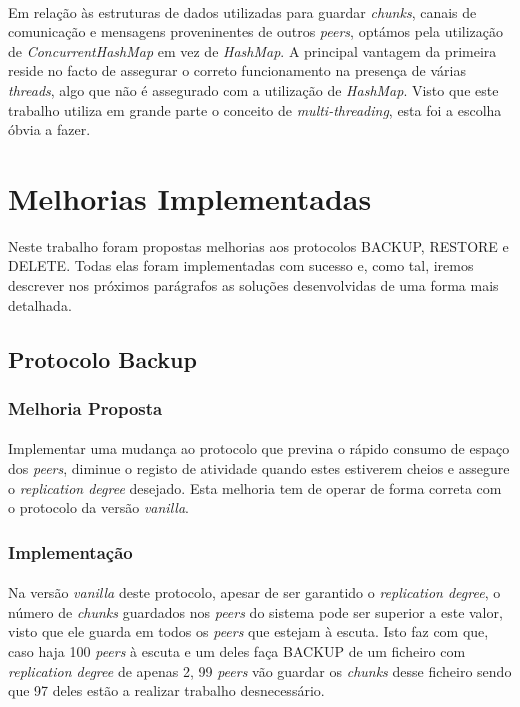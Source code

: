 \documentclass[11pt,oneside]{book}
\begin{document}
\paragraph{}
    Em relação às estruturas de dados utilizadas para guardar \textit{chunks},
    canais de comunicação e  
    mensagens proveninentes de outros \textit{peers}, optámos pela utilização de
    \textit{ConcurrentHashMap} em vez de \textit{HashMap}. A principal vantagem da
    primeira reside no facto de assegurar o correto funcionamento na presença de 
    várias \textit{threads}, algo que não é assegurado com a utilização de 
    \textit{HashMap}. Visto que este trabalho utiliza em grande parte o conceito de 
    \textit{multi-threading}, esta foi a escolha óbvia a fazer.
\pagebreak 

\section{Melhorias Implementadas}
    Neste trabalho foram propostas melhorias aos protocolos BACKUP, RESTORE e 
    DELETE. Todas elas foram implementadas com sucesso e, como tal, iremos descrever
    nos próximos parágrafos as soluções desenvolvidas de uma forma mais detalhada. 

\subsection{Protocolo Backup}

\subsubsection{Melhoria Proposta}
\paragraph{}
Implementar uma mudança ao protocolo que previna o rápido consumo de espaço dos 
\textit{peers}, diminue o registo de atividade quando estes estiverem cheios e 
assegure o \textit{replication degree} desejado. Esta melhoria tem de operar
de forma correta com o protocolo da versão \textit{vanilla}.

\subsubsection{Implementação}
\paragraph{}
    Na versão \textit{vanilla} deste protocolo, apesar de ser garantido o 
    \textit{replication degree}, o número de \textit{chunks} guardados nos 
    \textit{peers} do sistema pode ser superior a este valor, visto que ele
    guarda em todos os \textit{peers} que estejam à escuta. Isto faz com que, 
    caso haja 100 \textit{peers} à escuta e um deles faça BACKUP de um ficheiro
    com \textit{replication degree} de apenas 2, 99 \textit{peers} vão guardar os 
    \textit{chunks} desse ficheiro sendo que 97 deles estão a realizar
    trabalho desnecessário.
\end{document}
